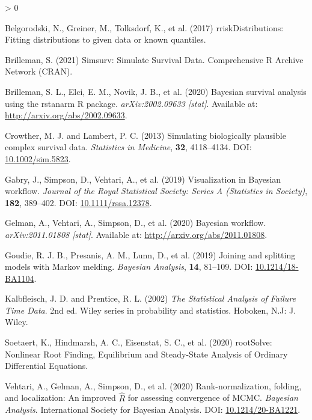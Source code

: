 \documentclass[
  10pt,
  a4paper,
]{article}
\newlength{\cslhangindent}
\newenvironment{CSLReferences}[2] %
 {%
  \setlength{\parindent}{0pt}
  \ifodd #1 \everypar{\setlength{\hangindent}{\cslhangindent}}\ignorespaces\fi
  \ifnum #2 > 0
  \setlength{\parskip}{#2\baselineskip}
  \fi
 }%
 {}
\begin{document}
\hypertarget{refs}{}
\begin{CSLReferences}{1}{0}
\leavevmode\hypertarget{ref-belgorodski_rriskdistributions_2017}{}%
Belgorodski, N., Greiner, M., Tolksdorf, K., et al. (2017)
{rriskDistributions}: {Fitting} distributions to given data or known
quantiles.

\leavevmode\hypertarget{ref-brilleman_simsurv_2021}{}%
Brilleman, S. (2021) Simsurv: {Simulate Survival Data}. Comprehensive R
Archive Network (CRAN).

\leavevmode\hypertarget{ref-brilleman_bayesian_2020}{}%
Brilleman, S. L., Elci, E. M., Novik, J. B., et al. (2020) Bayesian
survival analysis using the rstanarm {R} package. \emph{arXiv:2002.09633
{[}stat{]}}. Available at: \url{http://arxiv.org/abs/2002.09633}.

\leavevmode\hypertarget{ref-crowther_simulating_2013}{}%
Crowther, M. J. and Lambert, P. C. (2013) Simulating biologically
plausible complex survival data. \emph{Statistics in Medicine},
\textbf{32}, 4118--4134. DOI:
\href{https://doi.org/10.1002/sim.5823}{10.1002/sim.5823}.

\leavevmode\hypertarget{ref-gabry_visualization_2019}{}%
Gabry, J., Simpson, D., Vehtari, A., et al. (2019) Visualization in
{Bayesian} workflow. \emph{Journal of the Royal Statistical Society:
Series A (Statistics in Society)}, \textbf{182}, 389--402. DOI:
\href{https://doi.org/10.1111/rssa.12378}{10.1111/rssa.12378}.

\leavevmode\hypertarget{ref-gelman_bayesian_2020}{}%
Gelman, A., Vehtari, A., Simpson, D., et al. (2020) Bayesian workflow.
\emph{arXiv:2011.01808 {[}stat{]}}. Available at:
\url{http://arxiv.org/abs/2011.01808}.

\leavevmode\hypertarget{ref-goudie_joining_2019}{}%
Goudie, R. J. B., Presanis, A. M., Lunn, D., et al. (2019) Joining and
splitting models with {Markov} melding. \emph{Bayesian Analysis},
\textbf{14}, 81--109. DOI:
\href{https://doi.org/10.1214/18-BA1104}{10.1214/18-BA1104}.

\leavevmode\hypertarget{ref-kalbfleisch_statistical_2002}{}%
Kalbfleisch, J. D. and Prentice, R. L. (2002) \emph{The Statistical
Analysis of Failure Time Data}. 2nd ed. Wiley series in probability and
statistics. {Hoboken, N.J}: {J. Wiley}.

\leavevmode\hypertarget{ref-soetaert_rootsolve_2020}{}%
Soetaert, K., Hindmarsh, A. C., Eisenstat, S. C., et al. (2020)
{rootSolve}: {Nonlinear Root Finding}, {Equilibrium} and {Steady}-{State
Analysis} of {Ordinary Differential Equations}.

\leavevmode\hypertarget{ref-vehtari_rank-normalization_2020}{}%
Vehtari, A., Gelman, A., Simpson, D., et al. (2020) Rank-normalization,
folding, and localization: An improved \(\widehat{R}\) for assessing
convergence of {MCMC}. \emph{Bayesian Analysis}. {International Society
for Bayesian Analysis}. DOI:
\href{https://doi.org/10.1214/20-BA1221}{10.1214/20-BA1221}.

\end{CSLReferences}
\end{document}
